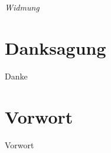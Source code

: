 \documentclass[12pt]{book}
\begin{document}
\pagestyle{empty}
\frontmatter

\chapter*{}
\begin{flushright}
\textit{Widmung}
\end{flushright}



\chapter*{Danksagung}

Danke



\chapter*{Vorwort}

\pagestyle{plain}

Vorwort



\tableofcontents


\mainmatter %
\pagestyle{headings}


\thispagestyle{empty}





\thispagestyle{empty}

\thispagestyle{empty}

\thispagestyle{empty}

\thispagestyle{empty}

\thispagestyle{empty}
\end{document}
